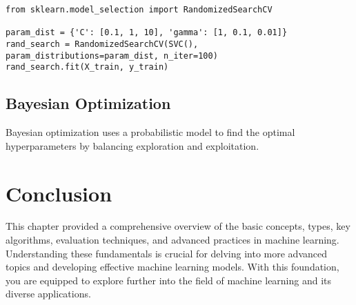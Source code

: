 \begin{verbatim}
from sklearn.model_selection import RandomizedSearchCV

param_dist = {'C': [0.1, 1, 10], 'gamma': [1, 0.1, 0.01]}
rand_search = RandomizedSearchCV(SVC(), param_distributions=param_dist, n_iter=100)
rand_search.fit(X_train, y_train)
\end{verbatim}

\subsection{Bayesian Optimization}
Bayesian optimization uses a probabilistic model to find the optimal hyperparameters by balancing exploration and exploitation.

\section{Conclusion}
This chapter provided a comprehensive overview of the basic concepts, types, key algorithms, evaluation techniques, and advanced practices in machine learning. Understanding these fundamentals is crucial for delving into more advanced topics and developing effective machine learning models. With this foundation, you are equipped to explore further into the field of machine learning and its diverse applications.


